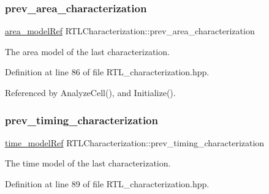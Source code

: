 \mbox{\label{classRTLCharacterization_a37173cc4c3dcf672588dd119de85e81c}} 
\subsubsection{\texorpdfstring{prev\+\_\+area\+\_\+characterization}{prev\_area\_characterization}}
{\footnotesize\ttfamily \hyperlink{area__model_8hpp_aec11e4e9b1b3afd49a437cb37df0abfb}{area\+\_\+model\+Ref} R\+T\+L\+Characterization\+::prev\+\_\+area\+\_\+characterization\hspace{0.3cm}{\ttfamily [private]}}



The area model of the last characterization. 



Definition at line 86 of file R\+T\+L\+\_\+characterization.\+hpp.



Referenced by Analyze\+Cell(), and Initialize().

\mbox{\label{classRTLCharacterization_a10951c85f4371dfd1133436377772bd3}} 
\subsubsection{\texorpdfstring{prev\+\_\+timing\+\_\+characterization}{prev\_timing\_characterization}}
{\footnotesize\ttfamily \hyperlink{time__model_8hpp_ae203bb7faf1c278333f76fcc6ebe412c}{time\+\_\+model\+Ref} R\+T\+L\+Characterization\+::prev\+\_\+timing\+\_\+characterization\hspace{0.3cm}{\ttfamily [private]}}



The time model of the last characterization. 



Definition at line 89 of file R\+T\+L\+\_\+characterization.\+hpp.



